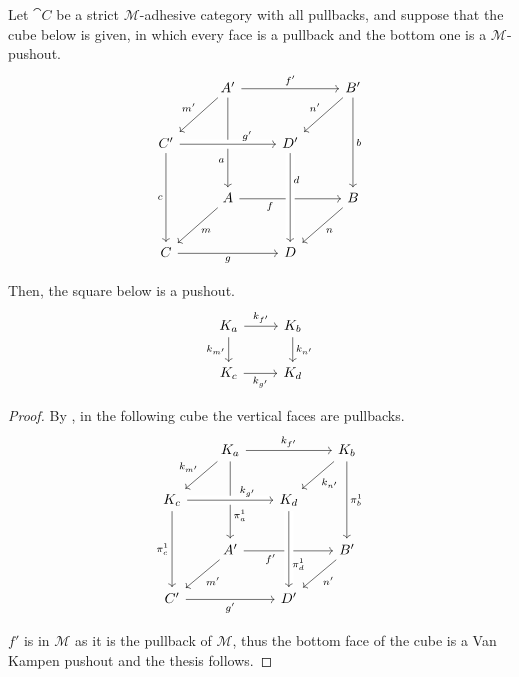 \begin{lemma}\label{lemma:pushouts_kernel_pairs}
    Let $\cat C$ be a strict $\mathcal{M}$-adhesive category with all pullbacks, and suppose that the cube below is given, in which every face is a pullback and the bottom one is a $\mathcal{M}$-pushout.
        \[\begin{tikzcd}[row sep=25, column sep=25]
	& {A'} && {B'} \\
	{C'} && {D'} \\
	& A && B \\
	C && D
	\arrow["{f'}", from=1-2, to=1-4]
	\arrow["{m'}"', from=1-2, to=2-1]
	\arrow["a"'{pos=0.7}, from=1-2, to=3-2]
	\arrow["{n'}"', from=1-4, to=2-3]
	\arrow["b", from=1-4, to=3-4]
	\arrow["{g'}"{pos=0.7}, from=2-1, to=2-3, crossing over]
	\arrow["c"', from=2-1, to=4-1]
	\arrow["f"'{pos=0.3}, from=3-2, to=3-4]
	\arrow["d"{pos=0.3}, from=2-3, to=4-3, crossing over]
	\arrow["m", from=3-2, to=4-1]
	\arrow["n", from=3-4, to=4-3]
	\arrow["g"', from=4-1, to=4-3]
    \end{tikzcd}\]
    
    Then, the square below is a pushout.
    \[
        \begin{tikzcd}%
            {K_a} \ar[r, "{k_{f'}}"] \ar[d, "{k_{m'}}"'] & {K_b} \ar[d, "{k_{n'}}"] \\
            {K_c} \ar[r, "{k_{g'}}"'] & {K_d}
        \end{tikzcd}
    \]
\end{lemma}

\begin{proof}
    By , in the following cube the vertical faces are pullbacks.
    \[\begin{tikzcd}[row sep = 20, column sep = 20]
        & {K_a} && {K_b} \\
        {K_c} && {K_d} \\
        & {A'} && {B'} \\
        {C'} && {D'}
        \arrow["{k_{f'}}", from=1-2, to=1-4]
        \arrow["{k_{m'}}"', from=1-2, to=2-1]
        \arrow["{\pi_a^1}"{pos=0.7}, from=1-2, to=3-2]
        \arrow["{k_{n'}}", from=1-4, to=2-3]
        \arrow["{\pi_b^1}", from=1-4, to=3-4]
        \arrow["{k_{g'}}"{pos=0.7}, from=2-1, to=2-3, crossing over]
        \arrow["{\pi_c^1}"', from=2-1, to=4-1]
        \arrow["{f'}"'{pos=0.3}, from=3-2, to=3-4]
        \arrow["{\pi_d^1}"{pos=0.7}, from=2-3, to=4-3, crossing over]
        \arrow["{m'}", from=3-2, to=4-1]
        \arrow["{n'}", from=3-4, to=4-3]
        \arrow["{g'}"', from=4-1, to=4-3]
    \end{tikzcd}\]

	$f'$ is in $\mathcal{M}$ as it is the pullback of $\mathcal{M}$, thus the bottom face of the cube is a Van Kampen pushout and the thesis follows.

\end{proof}


